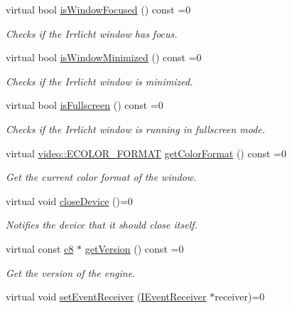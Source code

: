 \begin{DoxyCompactItemize}
virtual bool \hyperlink{classirr_1_1IrrlichtDevice_a960069dc52b4f1303d18945dcbad7f3a}{is\+Window\+Focused} () const =0
\begin{DoxyCompactList}\small\item\em Checks if the Irrlicht window has focus. \end{DoxyCompactList}\item 
virtual bool \hyperlink{classirr_1_1IrrlichtDevice_a69e96b9c49c65391e406377a92e795b1}{is\+Window\+Minimized} () const =0
\begin{DoxyCompactList}\small\item\em Checks if the Irrlicht window is minimized. \end{DoxyCompactList}\item 
virtual bool \hyperlink{classirr_1_1IrrlichtDevice_a409df5e9b9b90635bd3c2db31978a5c1}{is\+Fullscreen} () const =0
\begin{DoxyCompactList}\small\item\em Checks if the Irrlicht window is running in fullscreen mode. \end{DoxyCompactList}\item 
virtual \hyperlink{namespaceirr_1_1video_a1d5e487888c32b1674a8f75116d829ed}{video\+::\+E\+C\+O\+L\+O\+R\+\_\+\+F\+O\+R\+M\+AT} \hyperlink{classirr_1_1IrrlichtDevice_a9dccd3d7af7cfbabee46214a89bd6650}{get\+Color\+Format} () const =0
\begin{DoxyCompactList}\small\item\em Get the current color format of the window. \end{DoxyCompactList}\item 
virtual void \hyperlink{classirr_1_1IrrlichtDevice_a08c97937e0f60f98d443b397a7c60e18}{close\+Device} ()=0
\begin{DoxyCompactList}\small\item\em Notifies the device that it should close itself. \end{DoxyCompactList}\item 
virtual const \hyperlink{namespaceirr_a9395eaea339bcb546b319e9c96bf7410}{c8} $\ast$ \hyperlink{classirr_1_1IrrlichtDevice_a4eb5bc1b15f552ce2c37d792231392f7}{get\+Version} () const =0
\begin{DoxyCompactList}\small\item\em Get the version of the engine. \end{DoxyCompactList}\item 
virtual void \hyperlink{classirr_1_1IrrlichtDevice_abf71a5ed6bb6b287e769f699010cedf0}{set\+Event\+Receiver} (\hyperlink{classirr_1_1IEventReceiver}{I\+Event\+Receiver} $\ast$receiver)=0

\end{DoxyCompactItemize}
